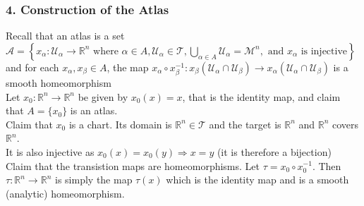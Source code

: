 \documentclass[11pt]{report}
\theoremstyle{thm}
\begin{document}
\subsubsection{4. Construction of the Atlas}
Recall that an atlas is a set $\mathcal{A} = \left\{ x_\alpha: 
\mathcal{U}_\alpha \rightarrow \mathbb{R}^n \text{ where } \alpha \in 
A,\mathcal{U}_\alpha \in \mathcal{T},  \bigcup\limits_{\alpha \in 
A}{\mathcal{U}_\alpha}=\mathcal{M}^n,\text{ and } x_\alpha\text{ is injective} 
\right\}$ and for each $x_{\alpha}, x_{\beta} \in A$, the map $x_\alpha \circ 
x_\beta^{-1} : x_\beta(\mathcal{U}_\alpha \cap \mathcal{U}_\beta) \rightarrow 
x_\alpha(\mathcal{U}_\alpha \cap \mathcal{U}_\beta)$ is a smooth 
homeomorphism\\[1.5em]
Let $x_0: \mathbb{R}^n \rightarrow \mathbb{R}^n$ be given by $x_0(x)=x$, that is the identity map, and claim that $A=\{x_0\}$ is an atlas.\\[1em]
Claim that $x_0$ is a chart. Its domain is $\mathbb{R}^n \in \mathcal{T}$ and 
the target is $\mathbb{R}^n$ and $\mathbb{R}^n$ covers $\mathbb{R}^n$.\\[1em]
It is also injective as $x_0(x)=x_0(y)\Rightarrow x=y$ (it is therefore a 
bijection)\\[1em]
Claim that the transistion maps are homeomorphisms. Let $\tau = x_0 \circ 
x_0^{-1}$. Then $\tau: \mathbb{R}^n \rightarrow \mathbb{R}^n$ is simply the map 
$\tau(x)$ which is the identity map and is a smooth (analytic) homeomorphism.
\end{document}
